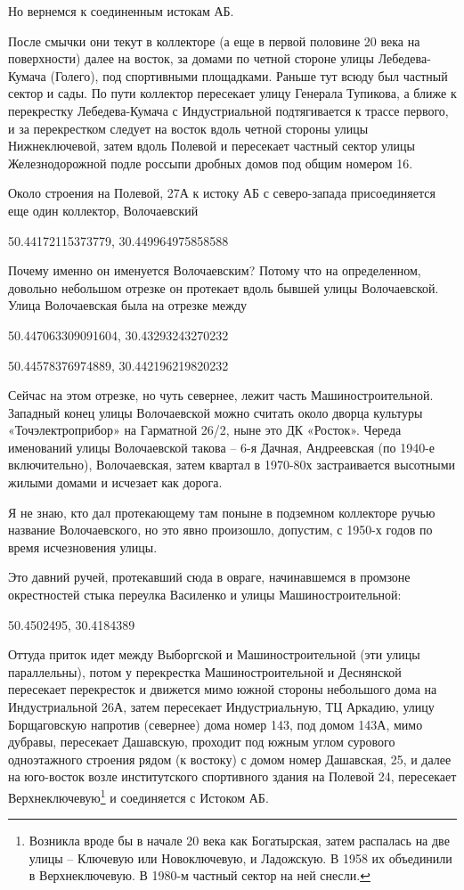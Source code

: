 Но вернемся к соединенным истокам АБ.

После смычки они текут в коллекторе (а еще в первой половине 20 века на поверхности) далее на восток, за домами по четной стороне улицы Лебедева-Кумача (Голего), под спортивными площадками. Раньше тут всюду был частный сектор и сады. По пути коллектор пересекает улицу Генерала Тупикова, а ближе к перекрестку Лебедева-Кумача с Индустриальной подтягивается к трассе первого, и за перекрестком следует на восток вдоль четной стороны улицы Нижнеключевой, затем вдоль Полевой и пересекает частный сектор улицы Железнодорожной подле россыпи дробных домов под общим номером 16. 

Около строения на Полевой, 27А к истоку АБ с северо-запада присоединяется еще один коллектор, Волочаевский

50.44172115373779, 30.449964975858588  

Почему именно он именуется Волочаевским? Потому что на определенном, довольно небольшом отрезке он протекает вдоль бывшей улицы Волочаевской. Улица Волочаевская была на отрезке между 

50.447063309091604, 30.43293243270232 

50.44578376974889, 30.442196219820232

Сейчас на этом отрезке, но чуть севернее, лежит часть Машиностроительной. Западный конец улицы Волочаевской можно считать около дворца культуры  «Точэлектроприбор» на Гарматной 26/2, ныне это ДК «Росток». Череда именований улицы Волочаевской такова – 6-я Дачная, Андреевская (по 1940-е включительно), Волочаевская, затем квартал в 1970-80х застраивается высотными жилыми домами и исчезает как дорога.

Я не знаю, кто дал протекающему там поныне в подземном коллекторе ручью название Волочаевского, но это явно произошло, допустим, с 1950-х годов по время исчезновения улицы. 


Это давний ручей, протекавший сюда в овраге, начинавшемся в промзоне окрестностей стыка переулка Василенко и улицы Машиностроительной:

50.4502495, 30.4184389

Оттуда приток идет между Выборгской и Машиностроительной (эти улицы параллельны), потом у перекрестка Машиностроительной и Деснянской пересекает перекресток и движется мимо южной стороны небольшого дома на Индустриальной 26А, затем пересекает Индустриальную, ТЦ Аркадию, улицу Борщаговскую напротив (севернее) дома номер 143, под домом 143А, мимо дубравы, пересекает Дашавскую, проходит под южным углом сурового одноэтажного строения рядом (к востоку) с домом номер Дашавская, 25, и далее на юго-восток возле институтского спортивного здания на Полевой 24, пересекает Верхнеключевую\footnote{Возникла вроде бы в начале 20 века как Богатырская, затем распалась на две улицы – Ключевую или Новоключевую, и Ладожскую. В 1958 их объединили в Верхнеключевую. В 1980-м частный сектор на ней снесли.} и соединяется с Истоком АБ.

